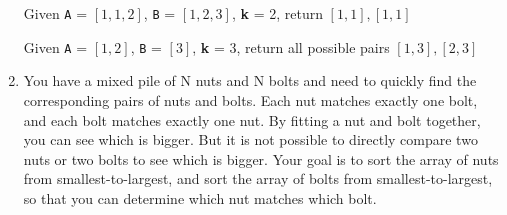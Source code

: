 \documentclass{article}
\begin{document}
\begin{enumerate}
	      Given \texttt{A} = $[1,1,2]$, \texttt{B} = $[1,2,3]$, \textbf{k} = 2, return $[1,1], [1,1]$
	      	      
	      Given \texttt{A} = $[1,2]$, \texttt{B} = $[3]$, \textbf{k} = 3, return all possible pairs $[1,3], [2,3]$
	      	      
	\item You have a mixed pile of N nuts and N bolts and need to quickly find the corresponding pairs of nuts and bolts. Each nut matches exactly one bolt, and each bolt matches exactly one nut. By fitting a nut and bolt together, you can see which is bigger. But it is not possible to directly compare two nuts or two bolts to see which is bigger. Your goal is to sort the array of nuts from smallest-to-largest, and sort the array of bolts from smallest-to-largest, so that you can determine which nut matches which bolt.
	      	      
\end{enumerate}

\clearpage
\end{document}
